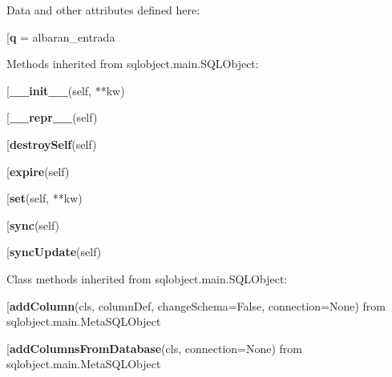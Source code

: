 Data and other attributes defined here:\\
\begin{description}\item[{\bf q} = albaran\_entrada\end{description}


Methods inherited from sqlobject.main.SQLObject:\\
\begin{description}\item[{\bf \_\_init\_\_}(self, **kw)\end{description}

\begin{description}\item[{\bf \_\_repr\_\_}(self)\end{description}

\begin{description}\item[{\bf destroySelf}(self)\end{description}

\begin{description}\item[{\bf expire}(self)\end{description}

\begin{description}\item[{\bf set}(self, **kw)\end{description}

\begin{description}\item[{\bf sync}(self)\end{description}

\begin{description}\item[{\bf syncUpdate}(self)\end{description}


Class methods inherited from sqlobject.main.SQLObject:\\
\begin{description}\item[{\bf addColumn}(cls, columnDef, changeSchema=False, connection=None) from sqlobject.main.MetaSQLObject\end{description}

\begin{description}\item[{\bf addColumnsFromDatabase}(cls, connection=None) from sqlobject.main.MetaSQLObject\end{description}

